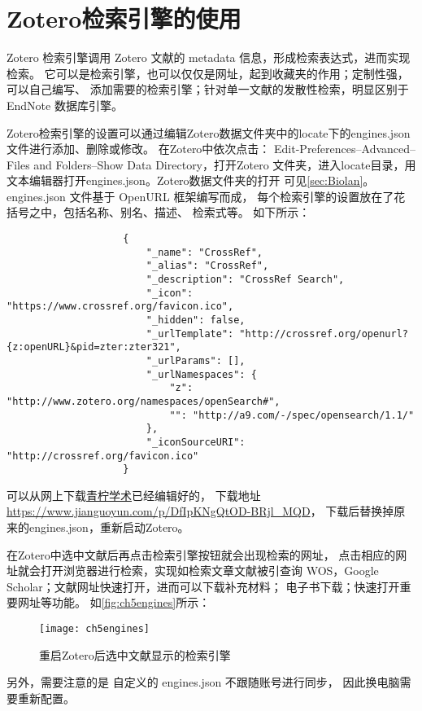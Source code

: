 \documentclass[cn,11pt,chinese]{elegantbook}
\begin{document}
				

		\section{Zotero检索引擎的使用}\label{sec:Engines}
			Zotero 检索引擎调用 Zotero 文献的 metadata 信息，形成检索表达式，进而实现检索。
			它可以是检索引擎，也可以仅仅是网址，起到收藏夹的作用；定制性强，可以自己编写、
			添加需要的检索引擎；针对单一文献的发散性检索，明显区别于 EndNote 数据库引擎。

			Zotero检索引擎的设置可以通过编辑Zotero数据文件夹中的locate下的engines.json
			文件进行添加、删除或修改。
			在Zotero中依次点击：
			Edit-Preferences–Advanced–Files and Folders–Show Data Directory，打开Zotero 
			文件夹，进入locate目录，用文本编辑器打开engines.json。Zotero数据文件夹的打开
			可见\cref{sec:Biolan}。engines.json 文件基于 OpenURL 框架编写而成，
			每个检索引擎的设置放在了花括号之中，包括名称、别名、描述、
			检索式等。
			如下所示：
				\begin{lstlisting}
					{
						"_name": "CrossRef",
						"_alias": "CrossRef",
						"_description": "CrossRef Search",
						"_icon": "https://www.crossref.org/favicon.ico",
						"_hidden": false,
						"_urlTemplate": "http://crossref.org/openurl?{z:openURL}&pid=zter:zter321",
						"_urlParams": [],
						"_urlNamespaces": {
							"z": "http://www.zotero.org/namespaces/openSearch#",
							"": "http://a9.com/-/spec/opensearch/1.1/"
						},
						"_iconSourceURI": "http://crossref.org/favicon.ico"
					}

				\end{lstlisting}
			
			
				可以从网上下载\href{https://www.zhihu.com/people/iseex/answers
			}{青柠学术}已经编辑好的，
			下载地址\url{https://www.jianguoyun.com/p/DfIpKNgQtOD-BRjl_MQD}，
			下载后替换掉原来的engines.json，重新启动Zotero。

			在Zotero中选中文献后再点击检索引擎按钮就会出现检索的网址，
			点击相应的网址就会打开浏览器进行检索，实现如检索文章文献被引查询
			WOS，Google Scholar；文献网址快速打开，进而可以下载补充材料；
			电子书下载；快速打开重要网址等功能。	
			如\autoref{fig:ch5engines}所示：
				\begin{figure}[ht]
					\centering
					\texttt{[image: ch5engines]}
					\caption{重启Zotero后选中文献显示的检索引擎}
					\label{fig:ch5engines}
				\end{figure}
			另外，需要注意的是
		自定义的 engines.json 不跟随账号进行同步，
		因此换电脑需要重新配置。
\end{document}

